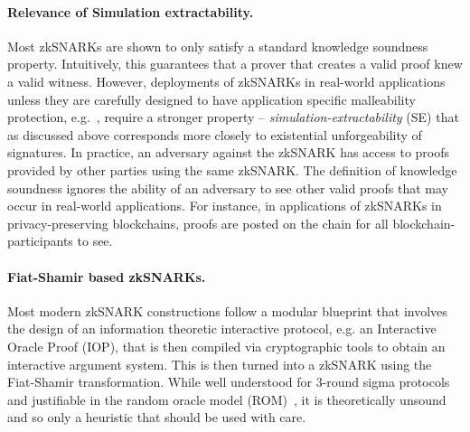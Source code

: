 \paragraph{Relevance of Simulation extractability.}

Most zkSNARKs are shown to only satisfy a standard knowledge soundness property. Intuitively, this guarantees that
a prover that creates a valid proof knew a valid witness. However, deployments of zkSNARKs in real-world applications unless they are carefully designed to have application specific malleability protection, e.g.~\cite{SP:BCGGMT14}, require a stronger property -- \textit{simulation-extractability} (SE) that as discussed above corresponds more closely to existential unforgeability of signatures.
In practice, an adversary against the zkSNARK has access to proofs provided by other parties using the same
zkSNARK.  The definition of knowledge soundness ignores the ability of an adversary to see other valid proofs that may occur in real-world applications.  For instance, in applications of
zkSNARKs in privacy-preserving blockchains, proofs are posted on the chain for all
blockchain-participants to see.

\paragraph{Fiat-Shamir based zkSNARKs.}
Most modern zkSNARK constructions follow a modular blueprint that involves the design of an information theoretic interactive protocol, e.g. an Interactive Oracle Proof (IOP), that is then compiled via cryptographic tools to obtain an interactive argument system.  This is then turned into a zkSNARK using the Fiat-Shamir transformation. While well understood for 3-round sigma protocols and justifiable in the random oracle
model (ROM)~\cite{CCS:BelRog93}, it is theoretically
unsound~\cite{FOCS:GolKal03} and so only a heuristic that should be used with
care.

